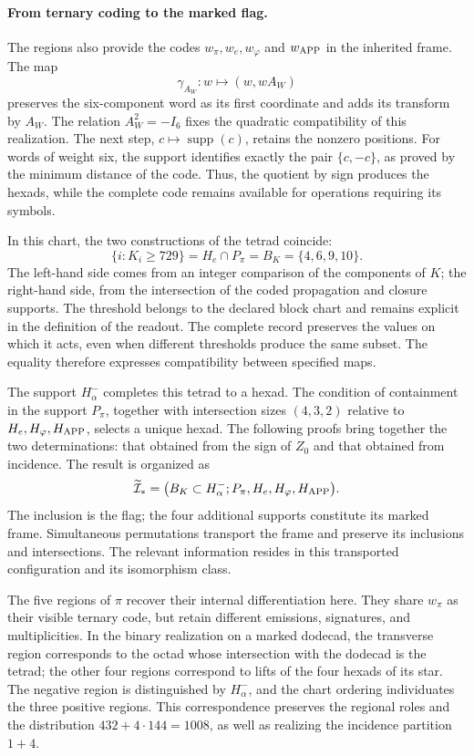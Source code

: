 \paragraph{From ternary coding to the marked flag.}
\label{inc-ampl-bandera}
The regions also provide the codes $w_\pi,w_e,w_\varphi$ and
$w_{\rm APP}$ in the inherited frame. The map
\[
 \gamma_{A_W}:w\longmapsto(w,wA_W)
\]
preserves the six-component word as its first coordinate and adds
its transform by $A_W$. The relation $A_W^2=-I_6$ fixes the
quadratic compatibility of this realization. The next step,
$c\mapsto\operatorname{supp}(c)$, retains the nonzero positions.
For words of weight six, the support identifies exactly the pair
$\{c,-c\}$, as proved by the minimum distance of the code. Thus,
the quotient by sign produces the hexads, while the complete code
remains available for operations requiring its symbols.

In this chart, the two constructions of the tetrad coincide:
\begin{equation}
 \{i:K_i\geq729\}
 =H_e\cap P_\pi=B_K=\{4,6,9,10\}.
 \label{inc-ampl-cuaterna}
\end{equation}
The left-hand side comes from an integer comparison of the components
of $K$; the right-hand side, from the intersection of the coded propagation
and closure supports. The threshold belongs to the declared block
chart and remains explicit in the definition of the readout. The
complete record preserves the values on which it acts, even when
different thresholds produce the same subset. The equality therefore
expresses compatibility between specified maps.

The support $H^-_\alpha$ completes this tetrad to a hexad. The
condition of containment in the support $P_\pi$, together with intersection
sizes $(4,3,2)$ relative to $H_e,H_\varphi,H_{\rm APP}$,
selects a unique hexad. The following proofs bring together the two
determinations: that obtained from the sign of $Z_0$ and that obtained
from incidence. The result is organized as
\begin{equation}
 \widetilde{\mathcal I}_*
 =\bigl(B_K\subset H^-_\alpha;
         P_\pi,H_e,H_\varphi,H_{\rm APP}\bigr).
 \label{inc-ampl-marco}
\end{equation}
The inclusion is the flag; the four additional supports constitute
its marked frame. Simultaneous permutations transport the frame and
preserve its inclusions and intersections. The relevant information resides
in this transported configuration and its isomorphism class.

The five regions of $\pi$ recover their internal differentiation here.
They share $w_\pi$ as their visible ternary code, but retain different emissions,
signatures, and multiplicities. In the binary realization on a
marked dodecad, the transverse region corresponds to the octad whose
intersection with the dodecad is the tetrad; the other four regions
correspond to lifts of the four hexads of its star. The
negative region is distinguished by $H^-_\alpha$, and the chart ordering
individuates the three positive regions. This correspondence preserves
the regional roles and the distribution $432+4\cdot144=1008$, as well as
realizing the incidence partition $1+4$.
